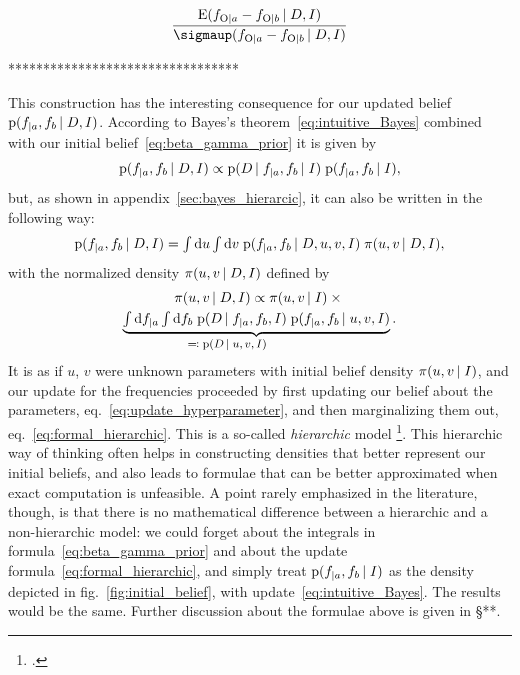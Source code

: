 \documentclass[\ifafour a4paper,12pt,\else a5paper,10pt,\fi%
onecolumn,oneside,article,%
british%
]{memoir}
\theoremstyle{remark}
\theoremstyle{innote}
\newcommand*{\citep}{\footcites}
\newcommand*{\di}{\mathrm{d}}%
\newcommand*{\defs}{\eqqcolon}
\newcommand*{\pf}{\mathrm{p}}%
\newcommand*{\E}{\mathrm{E}}
\renewcommand*{\|}[1][]{\nonscript\,#1\vert\nonscript\;\mathopen{}}
\newcommand*{\sect}{\S}%
\newcommand*{\eqn}{eq.}%
\newcommand*{\fig}{fig.}%
\newcommand*{\zerob}[1]{\makebox[0pt][l]{#1}}
\newcommand*{\tint}{\begingroup\textstyle\int\endgroup\nolimits}
\newcommand*{\std}{\sigmaup}
\newcommand*{\yD}{D}
\newcommand*{\yI}{I}
\newcommand*{\ya}{a}
\newcommand*{\yb}{b}
\newcommand*{\ysO}{\textrm{O}}%
\newcommand*{\dbeta}{\betaup}
\newcommand*{\dA}{\pi}
\newcommand*{\yua}{u}
\newcommand*{\yub}{v}
\begin{document}
\[
  \frac{  \E(f_{\ysO\|\ya} - f_{\ysO\|\yb} \| \yD, \yI)}{
    \std(f_{\ysO\|\ya} - f_{\ysO\|\yb} \| \yD, \yI)}
\]

*********************************

This construction has the interesting consequence for our updated belief
$\pf(f_{|\ya}, f_{\yb} \| \yD, \yI)$. According to Bayes's
theorem~\eqref{eq:intuitive_Bayes} combined with our initial
belief~\eqref{eq:beta_gamma_prior} it is given by
\begin{equation}
  \label{eq:straight_Bayes}
  \pf(f_{|\ya}, f_{\yb} \| \yD, \yI)
  \propto
  \pf(\yD \| f_{|\ya}, f_{\yb} \| \yI)\;
  \pf(f_{|\ya}, f_{\yb} \| \yI),
\end{equation}
but, as shown in appendix~\ref{sec:bayes_hierarcic}, it can also be written
in the following way:
\begin{equation}
  \label{eq:formal_hierarchic}
  \pf(f_{|\ya}, f_{\yb} \| \yD, \yI) =
  \tint\di\yua\tint\di\yub\;
  \pf(f_{|\ya}, f_{\yb}\| \yD,\yua,\yub,\yI)\;
  \dA(\yua,\yub \|\yD, \yI),
\end{equation}
with the normalized density $\dA(\yua,\yub \|\yD, \yI)$ defined by
\begin{multline}
  \label{eq:update_hyperparameter}
  \dA(\yua,\yub \|\yD, \yI) \propto   \dA(\yua,\yub \|\yI)
\times{}\\
\underbrace{\tint\di f_{|\ya}\tint\di f_{\yb}\;
  \pf(\yD \|f_{|\ya}, f_{\yb}, \yI)\;
 \pf(f_{|\ya}, f_{\yb} \|\yua,\yub, \yI)}_{\zerob{\footnotesize${}\defs\pf(\yD \|\yua,\yub,\yI)$}}.
\end{multline}
It is as if $\yua$, $\yub$ were unknown parameters with initial belief
density $\dA(\yua,\yub \|\yI)$, and our update for the frequencies proceeded by
first updating our belief about the parameters,
\eqn~\eqref{eq:update_hyperparameter}, and then marginalizing them out,
\eqn~\eqref{eq:formal_hierarchic}. This is a so-called \emph{hierarchic}
model \citep{good1980}. This hierarchic way of thinking often helps in
constructing densities that better represent our initial beliefs, and also
leads to formulae that can be better approximated when exact computation is
unfeasible. A point rarely emphasized in the literature, though, is that
there is no mathematical difference between a hierarchic and a
non-hierarchic model: we could forget about the integrals in
formula~\eqref{eq:beta_gamma_prior} and about the update
formula~\eqref{eq:formal_hierarchic}, and simply treat
$\pf(f_{|\ya}, f_{\yb} \| \yI)$ as the density depicted in
\fig~\ref{fig:initial_belief}, with update~\eqref{eq:intuitive_Bayes}. The
results would be the same. Further discussion about the formulae above is
given in \sect***.
\end{document}
